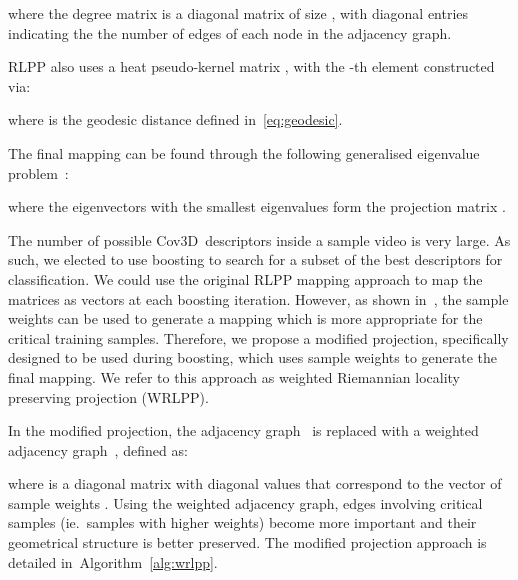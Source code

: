 \documentclass[10pt,twocolumn,letterpaper]{article}
\newcommand{\alg}[1]{\mbox{Algorithm~\ref{#1}}}
\newcommand{\eqsize}{\footnotesize}
\newcommand{\cov}{{Cov3D}}
\newcommand{\wrlpp}{WRLPP}
\begin{document}
\vspace{-1ex}
\noindent
\eqsize

\normalsize

\noindent
where the degree
matrix {\eqsize } is a diagonal matrix of size \mbox{\eqsize },
with diagonal entries indicating the the number of edges of each node in the adjacency graph.

RLPP also uses a heat pseudo-kernel matrix {\eqsize },
with the {\eqsize }-th element constructed via:

\noindent
\eqsize

\normalsize

\noindent
where {\eqsize } is the geodesic distance defined in~\eqref{eq:geodesic}.

The final mapping can be found through the following generalised eigenvalue problem~\cite{HarandiEtAl2012}:

\vspace{-1ex}
\eqsize

\normalsize

\noindent
where the eigenvectors with the {\eqsize } smallest eigenvalues form the projection matrix {\eqsize }.

The number of possible \cov~descriptors inside a sample video is very large.
As such, we elected to use boosting to search for a subset of the best descriptors for classification.
We could use the original RLPP mapping approach to map the matrices as vectors at each boosting iteration.
However, as shown in~\cite{TuzelEtAl2008}, the sample weights can be used to generate a mapping
which is more appropriate for the critical training samples.
Therefore, we propose a modified projection, specifically designed to be used during boosting,
which uses sample weights to generate the final mapping.
We refer to this approach as weighted Riemannian locality preserving projection (\wrlpp).

In the modified projection,
the adjacency graph~{\eqsize } is replaced 
with a weighted adjacency graph~{\eqsize },
defined as:

\vspace{-1ex}
\eqsize

\normalsize

\noindent
where {\eqsize } is a diagonal matrix with diagonal values
that correspond to the vector of sample weights {\eqsize }.
Using the weighted adjacency graph, edges involving critical samples
(ie.~samples with higher weights) become more important and their geometrical structure is better preserved.
The modified projection approach is detailed in~\alg{alg:wrlpp}.
\end{document}
